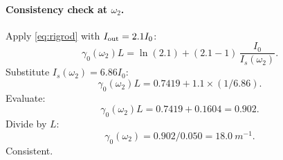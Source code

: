 \documentclass[11pt]{article}
\begin{document}
\paragraph{Consistency check at $\omega_2$.} Apply \eqref{eq:rigrod} with $I_{\rm out}=2.1I_0$:
\[
\gamma_0(\omega_2)L=\ln(2.1)+(2.1-1)\,\frac{I_0}{I_s(\omega_2)}.
\]
Substitute $I_s(\omega_2)=6.86I_0$:
\[
\gamma_0(\omega_2)L=0.7419+1.1\times(1/6.86).
\]
Evaluate:
\[
\gamma_0(\omega_2)L=0.7419+0.1604=0.902.
\]
Divide by $L$:
\[
\gamma_0(\omega_2)=0.902/0.050=\SI{18.0}{m^{-1}}.
\]
Consistent.
\end{document}

